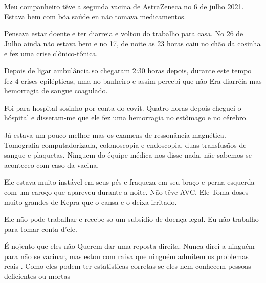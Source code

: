 Meu companheiro têve a segunda vacina de AstraZeneca no 6 de julho 2021. Estava
bem com bõa saúde en não tomava medicamentos.

Pensava estar doente e ter diarreia e voltou do trabalho para casa. No 26 de
Julho ainda não estava bem e no 17, de noite as 23 horas caiu no chão da cosinha
e fez uma crise clônico-tônica.

Depois de ligar ambulância so chegaram 2:30 horas depois, durante este tempo fez
4 crises epilépticas, uma no banheiro e assim percebi que não Era diarréia mas
hemorragia de sangue coagulado.

Foi para hospital sosinho por conta do covit. Quatro horas depois cheguei o
hóspital e disseram-me que ele fez uma hemorragia no estômago e no cérebro.

Já estava um pouco melhor mas os examens de ressonância magnética. Tomografia
computadorizada, colonoscopia e endoscopia, duas transfusãos de sangue e
plaquetas. Ninguem do équipe médica nos disse nada, nãe sabemos se aconteceo com
caso da vacina.

Ele estava muito instável em seus pés e fraqueza em seu braço e perna esquerda
com um caroço que apareveu durante a noite. Não têve AVC. Ele Toma doses muito
grandes de Kepra que o cansa e o deixa irritado.

Ele não pode trabalhar e recebe so um subsidio de doença legal. Eu não trabalho
para tomar conta d'ele.

É nojento que eles não Querem dar uma reposta direita. Nunca direi a ninguém
para não se vacinar, mas estou com raiva que ninguém admitem os problemas reais
. Como eles podem ter estatisticas corretas se eles nem conhecem pessoas
deficientes ou mortas
